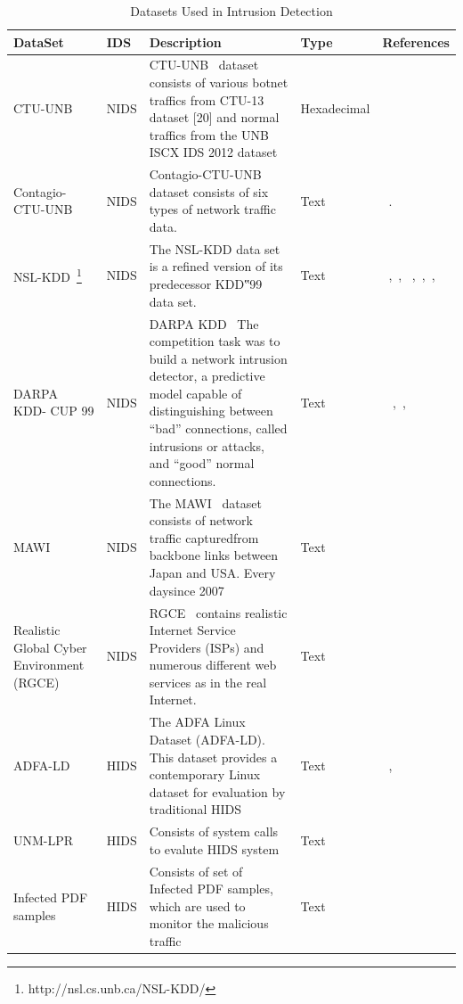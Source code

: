 \begin{table}
\begin{center}
  \caption{Datasets Used in Intrusion Detection }
   \label{tab:IDSDataset}
    \begin{tabular}{ | p{3cm} | l | p{5cm} | l | p{5cm} |}
    \hline
    DataSet &IDS & Description & Type & References \\ \hline
    CTU-UNB & NIDS & CTU-UNB~\cite{ucsdAnomalyDetect2017} dataset consists of various botnet traffics from CTU-13 dataset [20] and normal traffics from the UNB ISCX IDS 2012 dataset ~\cite{shiravi2012toward}  & Hexadecimal & ~\cite{yu2017network} \\ \hline
    Contagio-CTU-UNB & NIDS  & Contagio-CTU-UNB dataset consists of six types of network traffic data. ~\cite{adam2008robust}  & Text & ~\cite{yu2017network}. \\ \hline
    NSL-KDD~\footnote{http://nsl.cs.unb.ca/NSL-KDD/}& NIDS &The NSL-KDD data set is a refined version of its predecessor KDD‟99 data set.  ~\cite{ucsdAnomalyDetect2017} & Text &  ~\cite{yin2017deep},~\cite{javaid2016deep},  ~\cite{tang2016deep},~\cite{yousefi2017autoencoder},~\cite{mohammadi2017new}, ~\cite{lopez2017conditional}\\\hline
    DARPA KDD- CUP 99 & NIDS & DARPA KDD~\cite{stolfo2000cost} The competition task was to build a network intrusion detector, a predictive model capable of distinguishing between ``bad'' connections, called intrusions or attacks, and ``good'' normal connections.  & Text   & ~\cite{alrawashdeh2016toward} ,~\cite{van2017anomaly},~\cite{mohammadi2017new}\\\hline
    MAWI& NIDS  & The  MAWI~\cite{fontugne2010mawilab}  dataset  consists  of  network  traffic  capturedfrom  backbone  links  between  Japan  and  USA.  Every  daysince  2007  & Text   & ~\cite{cordero2016analyzing} \\\hline
    Realistic Global Cyber Environment (RGCE) & NIDS & RGCE~\cite{jamkRGCE}  contains
    realistic Internet Service Providers (ISPs) and numerous different web services as
    in the real Internet.  &  Text   & ~\cite{zolotukhin2016increasing} \\\hline
    ADFA-LD& HIDS & The ADFA Linux Dataset (ADFA-LD). This dataset provides a contemporary Linux dataset for evaluation by traditional HIDS~\cite{creech2014semantic} & Text   & ~\cite{kim2016lstm},~\cite{chawla2018host} \\\hline
    UNM-LPR& HIDS & Consists of system calls to evalute HIDS system~\cite{ImmuneDatasets} & Text   & ~\cite{kim2016lstm} \\\hline
    Infected PDF samples& HIDS & Consists of set of Infected PDF samples, which are used to monitor the malicious traffic  & Text   &~\cite{chen2018henet}\\\hline
    \end{tabular}
\end{center}
\end{table}












